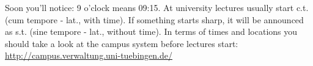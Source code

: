 
Soon you'll notice: 9 o'clock means 09:15. At university lectures usually start c.t. (cum
tempore - lat., with time). If something starts \glqq sharp\grqq, it will be announced as s.t. (sine tempore - lat., without
time). In terms of times and locations you should take a look at the campus system before lectures start:\\
\url{http://campus.verwaltung.uni-tuebingen.de/}
